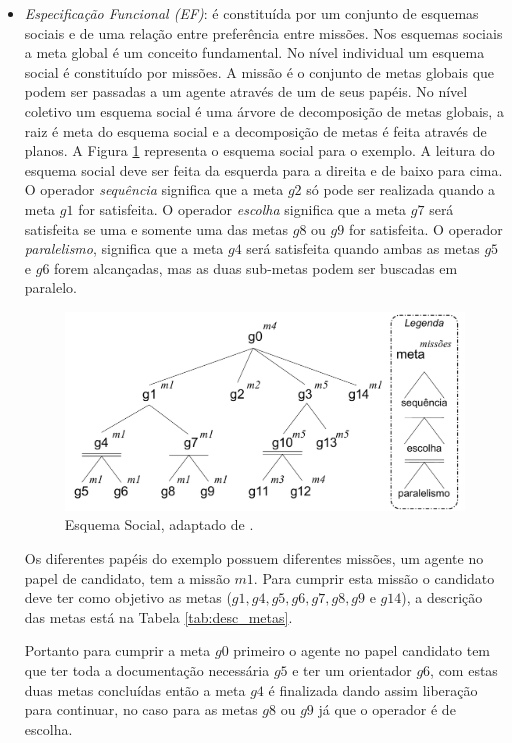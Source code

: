 \begin{itemize}
\item {\it Especificação Funcional (EF)}: é constituída por um conjunto de esquemas sociais e de uma relação entre preferência entre missões. Nos esquemas sociais a meta global é um conceito fundamental. No nível individual um esquema social é constituído por missões. A missão é o conjunto de metas globais que podem ser passadas a um agente através de um de seus papéis. No nível coletivo um esquema social é uma árvore de decomposição de metas globais, a raiz é meta do esquema social e a decomposição de metas é feita através de planos. A Figura \ref{fig:es_exemplo} representa o esquema social para o exemplo. A leitura do esquema social deve ser feita da esquerda para a direita e de baixo para cima. O operador \textit{sequência} significa que a meta $g2$ só pode ser realizada quando a meta $g1$ for satisfeita. O operador \textit{escolha} significa que a meta $g7$ será satisfeita se uma e somente uma das metas $g8$ ou $g9$ for satisfeita. O operador \textit{paralelismo}, significa que a meta $g4$ será satisfeita quando ambas as metas $g5$ e $g6$ forem alcançadas, mas as duas sub-metas podem ser buscadas em paralelo. 
\begin{figure}[ht]
\centering
\includegraphics[scale=0.4]{imagens/ES2.pdf}
\caption{Esquema Social, adaptado de \cite{hubner2003modelo}.}
\label{fig:es_exemplo}
\end{figure}

Os diferentes papéis do exemplo possuem diferentes missões, um agente no papel de candidato, tem a missão $m1$. Para cumprir esta missão o candidato deve ter como objetivo as metas ($g1, g4, g5, g6, g7, g8, g9$ e $g14$), a descrição das metas está na Tabela \ref{tab:desc_metas}.

Portanto para cumprir a meta $g0$ primeiro o agente no papel candidato tem que ter toda a documentação necessária $g5$ e ter um orientador $g6$, com estas duas metas concluídas então a meta $g4$ é finalizada dando assim liberação para continuar, no caso para as metas $g8$ ou $g9$ já que o operador é de escolha.


\end{itemize}

